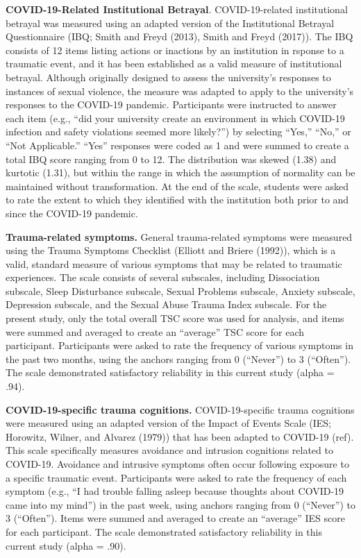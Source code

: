 \documentclass[
  english,
  man,draftall]{apa6}
\begin{document}
\textbf{COVID-19-Related Institutional Betrayal}. COVID-19-related institutional betrayal was measured using an adapted version of the Institutional Betrayal Questionnaire (IBQ; Smith and Freyd (2013), Smith and Freyd (2017)). The IBQ consists of 12 items listing actions or inactions by an institution in rsponse to a traumatic event, and it has been established as a valid measure of institutional betrayal. Although originally designed to assess the university's responses to instances of sexual violence, the measure was adapted to apply to the university's responses to the COVID-19 pandemic. Participants were instructed to answer each item (e.g., \enquote{did your university create an environment in which COVID-19 infection and safety violations seemed more likely?}) by selecting \enquote{Yes,} \enquote{No,} or \enquote{Not Applicable.} \enquote{Yes} responses were coded as 1 and were summed to create a total IBQ score ranging from 0 to 12. The distribution was skewed (1.38) and kurtotic (1.31), but within the range in which the assumption of normality can be maintained without transformation. At the end of the scale, students were asked to rate the extent to which they identified with the institution both prior to and since the COVID-19 pandemic.

\textbf{Trauma-related symptoms.} General trauma-related symptoms were measured using the Trauma Symptoms Checklist (Elliott and Briere (1992)), which is a valid, standard measure of various symptoms that may be related to traumatic experiences. The scale consists of several subscales, including Dissociation subscale, Sleep Disturbance subscale, Sexual Problems subscale, Anxiety subscale, Depression subscale, and the Sexual Abuse Trauma Index subscale. For the present study, only the total overall TSC score was used for analysis, and items were summed and averaged to create an \enquote{average} TSC score for each participant. Participants were asked to rate the frequency of various symptoms in the past two months, using the anchors ranging from 0 (\enquote{Never}) to 3 (\enquote{Often}). The scale demonstrated satisfactory reliability in this current study (alpha = .94).

\textbf{COVID-19-specific trauma cognitions.} COVID-19-specific trauma cognitions were measured using an adapted version of the Impact of Events Scale (IES; Horowitz, Wilner, and Alvarez (1979)) that has been adapted to COVID-19 (ref). This scale specifically measures avoidance and intrusion cognitions related to COVID-19. Avoidance and intrusive symptoms often occur following exposure to a specific traumatic event. Participants were asked to rate the frequency of each symptom (e.g., \enquote{I had trouble falling asleep because thoughts about COVID-19 came into my mind}) in the past week, using anchors ranging from 0 (\enquote{Never}) to 3 (\enquote{Often}). Items were summed and averaged to create an \enquote{average} IES score for each participant. The scale demonstrated satisfactory reliability in this current study (alpha = .90).
\end{document}
